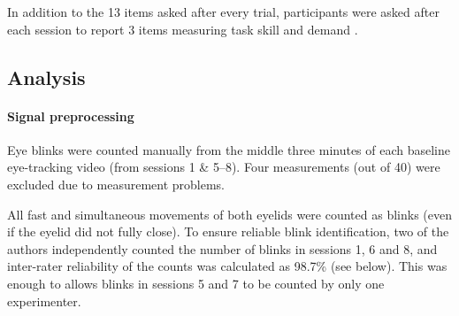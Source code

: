 \documentclass[10pt,letterpaper,floatsintext]{article}
\begin{document}
In addition to the 13 items asked after every trial, participants were asked after each session to report 3 items measuring task skill and demand \cite{Rheinberg2003}.

%
%

\subsection*{Analysis}

\paragraph{Signal preprocessing}
Eye blinks were counted manually from the middle three minutes of each baseline eye-tracking video (from sessions 1 \& 5--8). Four measurements (out of 40) were excluded due to measurement problems.

All fast and simultaneous movements of both eyelids were counted as blinks (even if the eyelid did not fully close). To ensure reliable blink identification, two of the authors independently counted the number of blinks in sessions 1, 6 and 8, and inter-rater reliability of the counts was calculated as 98.7\% (see below). This was enough to allows blinks in sessions 5 and 7 to be counted by only one experimenter.
\end{document}
